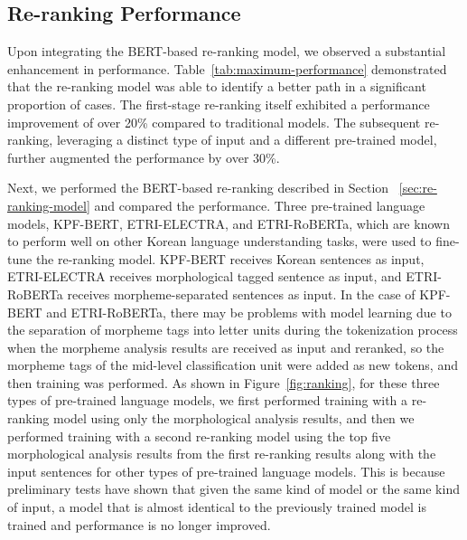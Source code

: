 \documentclass[AMS,STIX2COL]{WileyNJD-v2}
\begin{document}
    \subsection{Re-ranking Performance}\label{subsec5.4}

    Upon integrating the BERT-based re-ranking model, we observed a substantial enhancement in performance. Table~\ref{tab:maximum-performance} demonstrated that the re-ranking model was able to identify a better path in a significant proportion of cases. The first-stage re-ranking itself exhibited a performance improvement of over 20\% compared to traditional models. The subsequent re-ranking, leveraging a distinct type of input and a different pre-trained model, further augmented the performance by over 30\%.

    Next, we performed the BERT-based re-ranking described in Section ~\ref{sec:re-ranking-model} and compared the performance.
    Three pre-trained language models, KPF-BERT, ETRI-ELECTRA, and ETRI-RoBERTa, which are known to perform well on other Korean language understanding tasks, were used to fine-tune the re-ranking model. KPF-BERT receives Korean sentences as input, ETRI-ELECTRA receives morphological tagged sentence as input, and ETRI-RoBERTa receives morpheme-separated sentences as input. In the case of KPF-BERT and ETRI-RoBERTa, there may be problems with model learning due to the separation of morpheme tags into letter units during the tokenization process when the morpheme analysis results are received as input and reranked, so the morpheme tags of the mid-level classification unit were added as new tokens, and then training was performed.
    As shown in Figure~\ref{fig:ranking}, for these three types of pre-trained language models, we first performed training with a re-ranking model using only the morphological analysis results, and then we performed training with a second re-ranking model using the top five morphological analysis results from the first re-ranking results along with the input sentences for other types of pre-trained language models. This is because preliminary tests have shown that given the same kind of model or the same kind of input, a model that is almost identical to the previously trained model is trained and performance is no longer improved.
\end{document}
